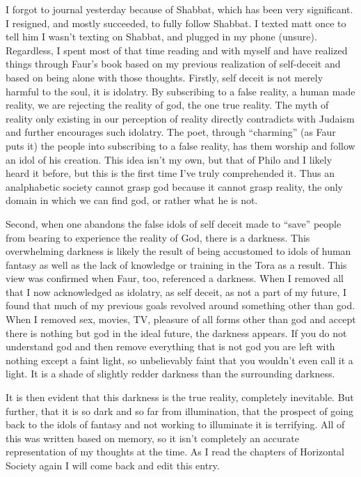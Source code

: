 I forgot to journal yesterday because of Shabbat, which has been very
significant. I resigned, and mostly succeeded, to fully follow Shabbat.
I texted matt once to tell him I wasn't texting on Shabbat, and plugged
in my phone (unsure). Regardless, I spent most of that time reading and
with myself and have realized things through Faur's book based on my
previous realization of self-deceit and based on being alone with those
thoughts. Firstly, self deceit is not merely harmful to the soul, it is
idolatry. By subscribing to a false reality, a human made reality, we
are rejecting the reality of god, the one true reality. The myth of
reality only existing in our perception of reality directly contradicts
with Judaism and further encourages such idolatry. The poet, through
``charming'' (as Faur puts it) the people into subscribing to a false
reality, has them worship and follow an idol of his creation. This idea
isn't my own, but that of Philo and I likely heard it before, but this
is the first time I've truly comprehended it. Thus an analphabetic
society cannot grasp god because it cannot grasp reality, the only
domain in which we can find god, or rather what he is not.

Second, when one abandons the false idols of self deceit made to
``save'' people from bearing to experience the reality of God, there is
a darkness. This overwhelming darkness is likely the result of being
accustomed to idols of human fantasy as well as the lack of knowledge or
training in the Tora as a result. This view was confirmed when Faur,
too, referenced a darkness. When I removed all that I now acknowledged
as idolatry, as self deceit, as not a part of my future, I found that
much of my previous goals revolved around something other than god. When
I removed sex, movies, TV, pleasure of all forms other than god and
accept there is nothing but god in the ideal future, the darkness
appears. If you do not understand god and then remove everything that is
not god you are left with nothing except a faint light, so unbelievably
faint that you wouldn't even call it a light. It is a shade of slightly
redder darkness than the surrounding darkness.

It is then evident that this darkness is the true reality, completely
inevitable. But further, that it is so dark and so far from
illumination, that the prospect of going back to the idols of fantasy
and not working to illuminate it is terrifying. All of this was written
based on memory, so it isn't completely an accurate representation of my
thoughts at the time. As I read the chapters of Horizontal Society again
I will come back and edit this entry.

